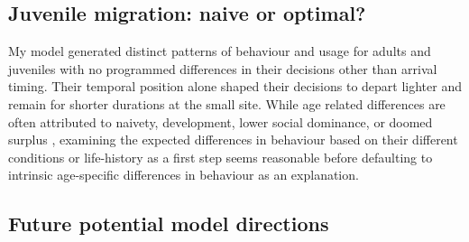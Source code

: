 \subsection*{Juvenile migration: naive or optimal?}

My model generated distinct patterns of behaviour and usage for adults and juveniles with no programmed differences in their decisions other than arrival timing. Their temporal position alone shaped their decisions to depart lighter and remain for shorter durations at the small site. While age related differences are often attributed to naivety, development, lower social dominance, or doomed surplus \citep{newton2010migration}, examining the expected differences in behaviour based on their different conditions or life-history as a first step seems reasonable before defaulting to intrinsic age-specific differences in behaviour as an explanation. 






\subsection*{Future potential model directions}

